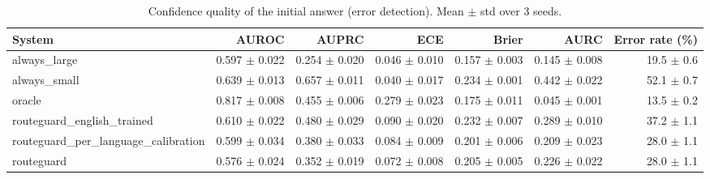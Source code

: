 \begin{table}[t]
\centering
\small
\caption{Confidence quality of the initial answer (error detection). Mean $\pm$ std over 3 seeds.}
\label{tab:calibration}
\begin{tabular}{lrrrrrr}
\toprule
System & AUROC & AUPRC & ECE & Brier & AURC & Error rate (\%) \\
\midrule
always\_large & 0.597 $\pm$ 0.022 & 0.254 $\pm$ 0.020 & 0.046 $\pm$ 0.010 & 0.157 $\pm$ 0.003 & 0.145 $\pm$ 0.008 & 19.5 $\pm$ 0.6 \\
always\_small & 0.639 $\pm$ 0.013 & 0.657 $\pm$ 0.011 & 0.040 $\pm$ 0.017 & 0.234 $\pm$ 0.001 & 0.442 $\pm$ 0.022 & 52.1 $\pm$ 0.7 \\
oracle & 0.817 $\pm$ 0.008 & 0.455 $\pm$ 0.006 & 0.279 $\pm$ 0.023 & 0.175 $\pm$ 0.011 & 0.045 $\pm$ 0.001 & 13.5 $\pm$ 0.2 \\
routeguard\_english\_trained & 0.610 $\pm$ 0.022 & 0.480 $\pm$ 0.029 & 0.090 $\pm$ 0.020 & 0.232 $\pm$ 0.007 & 0.289 $\pm$ 0.010 & 37.2 $\pm$ 1.1 \\
routeguard\_per\_language\_calibration & 0.599 $\pm$ 0.034 & 0.380 $\pm$ 0.033 & 0.084 $\pm$ 0.009 & 0.201 $\pm$ 0.006 & 0.209 $\pm$ 0.023 & 28.0 $\pm$ 1.1 \\
routeguard & 0.576 $\pm$ 0.024 & 0.352 $\pm$ 0.019 & 0.072 $\pm$ 0.008 & 0.205 $\pm$ 0.005 & 0.226 $\pm$ 0.022 & 28.0 $\pm$ 1.1 \\
\bottomrule
\end{tabular}
\end{table}
